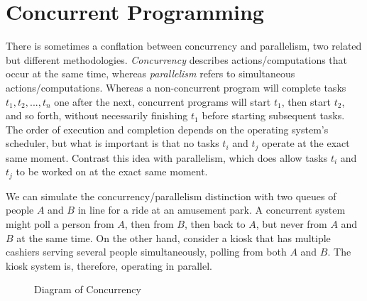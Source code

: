 \section{Concurrent Programming}

There is sometimes a conflation between concurrency and parallelism, two related but different methodologies. \emph{Concurrency} describes actions/computations that occur at the same time, whereas \emph{parallelism} refers to simultaneous actions/computations. Whereas a non-concurrent program will complete tasks $t_1, t_2, ..., t_n$ one after the next, concurrent programs will start $t_1$, then start $t_2$, and so forth, without necessarily finishing $t_1$ before starting subsequent tasks. The order of execution and completion depends on the operating system's scheduler, but what is important is that no tasks $t_i$ and $t_j$ operate at the exact same moment. Contrast this idea with parallelism, which does allow tasks $t_i$ and $t_j$ to be worked on at the exact same moment. 

We can simulate the concurrency/parallelism distinction with two queues of people $A$ and $B$ in line for a ride at an amusement park. A concurrent system might poll a person from $A$, then from $B$, then back to $A$, but never from $A$ and $B$ at the same time. On the other hand, consider a kiosk that has multiple cashiers serving several people simultaneously, polling from both $A$ and $B$. The kiosk system is, therefore, operating in parallel. 

\begin{figure}[ht]
\centering
{}
\caption{Diagram of Concurrency}
\end{figure}

